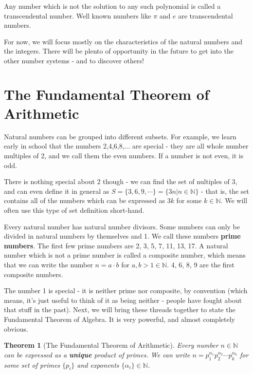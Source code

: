 \documentclass{article}
\newtheorem{theorem}{Theorem}
\begin{document}
Any number which is not the solution to any such polynomial is called a
transcendental number. Well known numbers like $\pi$ and $e$ are transcendental
numbers.

For now, we will focus mostly on the characteristics of the natural numbers and
the integers. There will be plento of opportunity in the future to get into the
other number systems - and to discover others!

\section{The Fundamental Theorem of Arithmetic}

Natural numbers can be grouped into different subsets. For example, we learn
early in school that the numbers 2,4,6,8,... are special - they are all whole
number multiples  of 2, and we call them the even numbers. If a number is not even,
it is odd.

There is nothing special about 2 though - we can find the set of nultiples of 3, and
can even define it in general as $S = \{3,6,9,\cdots\} = \{ 3n | n \in \mathbb{N}\}$
- that is, the set contains all of the numbers which can be expressed as $3k$ for some
$k\in \mathbb{N}$. We will often use this type of set definition short-hand.

Every natural number has natural number divisors. Some numbers can only be divided in
natural numbers by themselves and 1. We call these numbers \textbf{prime numbers}. The
first few prime numbers are 2, 3, 5, 7, 11, 13, 17. A natural number which is not a
prime number is called a composite number, which means that we can write the number
$n = a \cdot b$ for $a,b > 1 \in \mathbb{N}$. 4, 6, 8, 9 are the first composite numbers.

The number 1 is special - it is neither prime nor composite, by convention (which
means, it's just useful to think of it as being neither - people have fought about
that stuff in the past). Next, we will bring these threads together to state the
Fundamental Theorem of Algebra. It is very powerful, and almost completely obvious.

\begin{theorem}[The Fundamental Theorem of Arithmetic]

Every number $n \in \mathbb{N}$ can be expressed as a \textbf{unique}
product of primes. We can write $n = p_1^{\alpha_1}p_2^{\alpha_2}\cdots p_k^{\alpha_k}$
for some set of primes $\{p_i\}$ and exponents $\{\alpha_i\} \in \mathbb{N}$.
\end{theorem}
\end{document}
